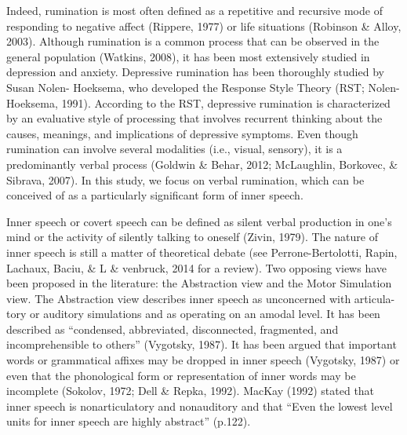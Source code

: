 \documentclass[12pt,]{book}
\theoremstyle{definition}
\theoremstyle{definition}
\theoremstyle{definition}
\theoremstyle{remark}
\begin{document}
Indeed, rumination is most often defined as a repetitive and recursive
mode of responding to negative affect (Rippere, 1977) or life situations
(Robinson \& Alloy, 2003). Although rumination is a common process that
can be observed in the general population (Watkins, 2008), it has been
most extensively studied in depression and anxiety. Depressive
rumination has been thoroughly studied by Susan Nolen- Hoeksema, who
developed the Response Style Theory (RST; Nolen-Hoeksema, 1991).
According to the RST, depressive rumination is characterized by an
evaluative style of processing that involves recurrent thinking about
the causes, meanings, and implications of depressive symptoms. Even
though rumination can involve several modalities (i.e., visual,
sensory), it is a predominantly verbal process (Goldwin \& Behar, 2012;
McLaughlin, Borkovec, \& Sibrava, 2007). In this study, we focus on
verbal rumination, which can be conceived of as a particularly
significant form of inner speech.

Inner speech or covert speech can be defined as silent verbal production
in one's mind or the activity of silently talking to oneself (Zivin,
1979). The nature of inner speech is still a matter of theoretical
debate (see Perrone-Bertolotti, Rapin, Lachaux, Baciu, \& L \& venbruck,
2014 for a review). Two opposing views have been proposed in the
literature: the Abstraction view and the Motor Simulation view. The
Abstraction view describes inner speech as unconcerned with articula-
tory or auditory simulations and as operating on an amodal level. It has
been described as ``condensed, abbreviated, disconnected, fragmented,
and incomprehensible to others'' (Vygotsky, 1987). It has been argued
that important words or grammatical affixes may be dropped in inner
speech (Vygotsky, 1987) or even that the phonological form or
representation of inner words may be incomplete (Sokolov, 1972; Dell \&
Repka, 1992). MacKay (1992) stated that inner speech is nonarticulatory
and nonauditory and that ``Even the lowest level units for inner speech
are highly abstract'' (p.122).
\end{document}
